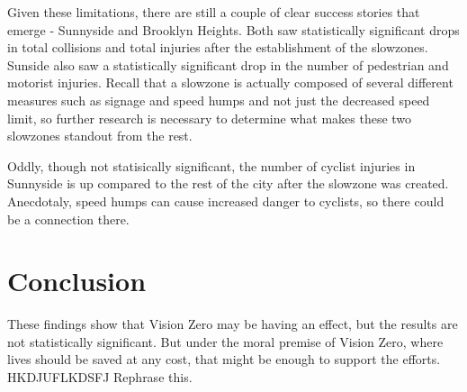 \documentclass[10pt,journal,compsoc]{IEEEtran}
\begin{document}
Given these limitations, there are still a couple of clear success stories that emerge - Sunnyside and Brooklyn Heights.  Both saw statistically significant drops in total collisions and total injuries after the establishment of the slowzones.  Sunside also saw a statistically significant drop in the number of pedestrian and motorist injuries.  Recall that a slowzone is actually composed of several different measures such as signage and speed humps and not just the decreased speed limit, so further research is necessary to determine what makes these two slowzones standout from the rest.

Oddly, though not statisically significant, the number of cyclist injuries in Sunnyside is up compared to the rest of the city after the slowzone was created.  Anecdotaly, speed humps can cause increased danger to cyclists, so there could be a connection there. 

\section{Conclusion}
These findings show that Vision Zero may be having an effect, but the results are not statistically significant.  But under the moral premise of Vision Zero, where lives should be saved at any cost, that might be enough to support the efforts.  HKDJUFLKDSFJ Rephrase this.
\end{document}
